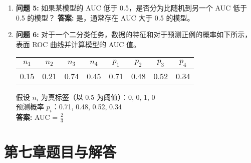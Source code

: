 \documentclass[a4paper,12pt]{book}
\begin{document}
\begin{enumerate}
\item \textbf{问题 5:} 如果某模型的 AUC 低于 0.5，是否分为比随机到另一个 AUC 低于 0.5 的模型？
\textbf{答案:} 是，通常存在 AUC 大于 0.5 的模型。

\item \textbf{问题 6:} 对于一个二分类任务，数据的特征和对于预测正例的概率如下所示，表面 ROC 曲线并计算模型的 AUC 值。

\begin{table}[h]
\begin{tabular}{|c|c|c|c|c|c|c|c|}
\hline
\(n_1\) & \(n_2\) & \(n_3\) & \(n_4\) & \(p_1\) & \(p_2\) & \(p_3\) & \(p_4\) \\
\hline
0.15 & 0.21 & 0.74 & 0.45 & 0.71 & 0.48 & 0.52 & 0.34 \\
\hline
\end{tabular}
\end{table}
假设 \(n_i\) 为真标签（以 0.5 为阈值）：0, 0, 1, 0 \\
预测概率 \(p_i\)：0.71, 0.48, 0.52, 0.34 \\
\textbf{答案:} AUC = \(\frac{2}{3}\)

\end{enumerate}

\section*{第七章题目与解答}
\end{document}

